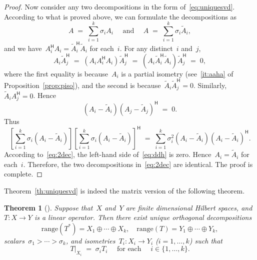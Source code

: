 \documentclass[11pt,a4paper]{article}  %
\numberwithin{equation}{section}
\newtheorem{theorem}{Theorem}%
\theoremstyle{definition}
\newcommand{\hmt}{{\scriptscriptstyle{{\mathsf{H}}}}}
\newcommand{\range}{\mathrm{range}}
\begin{document}
\begin{proof}
  Now consider any two decompositions in the form of~\eqref{eq:uniquesvd}. According to what is
  proved above, we can formulate the decompositions as
  \begin{equation}
    \label{eq:2dec}
    A \;=\; \sum_{i=1}^k \sigma_i A_i \quad \text{ and } \quad
    A\;=\;\sum_{i=1}^k \sigma_i \tilde{A}_i,
  \end{equation}
  and we have~$A_i^\hmt A_i= \tilde{A}_i^\hmt\tilde{A}_i$ for each~$i$.
  For any distinct~$i$ and~$j$,
  \begin{equation*}
    A_i\tilde{A}_j^\hmt \;=\; (A_iA_i^\hmt A_i)\tilde{A}_j^\hmt
    \;=\; (A_i\tilde{A}_i^\hmt \tilde{A}_i)\tilde{A}_j^\hmt \;=\; 0,
  \end{equation*}
  where the first equality is because~$A_i$ is a partial isometry (see~\ref{it:aaha} of
  Proposition~\ref{prop:piso}), and the second is because~$\tilde{A}_i\tilde{A}_j^\hmt = 0$.
  Similarly, $\tilde{A}_iA_j^\hmt = 0$. Hence
  \begin{equation*}
    (A_i-\tilde{A}_i)(A_j-\tilde{A}_j)^\hmt \;=\; 0.
  \end{equation*}
  Thus
  \begin{equation}
    \label{eq:ddh}
    \left[\sum_{i=1}^k \sigma_i(A_i-\tilde{A}_i) \right]
    \left[\sum_{i=1}^k \sigma_i(A_i-\tilde{A}_i) \right]^\hmt
    \;=\; \sum_{i=1}^k \sigma_i^2 (A_i-\tilde{A}_i)(A_i-\tilde{A}_i)^\hmt.
  \end{equation}
  According to~\eqref{eq:2dec}, the left-hand side of~\eqref{eq:ddh} is zero.
  Hence~$A_i=\tilde{A}_i$ for each~$i$. Therefore, the two decompositions in~\eqref{eq:2dec} are
  identical. The proof is complete.
\end{proof}

Theorem~\ref{th:uniquesvd} is indeed the matrix version of the following theorem.

\begin{theorem}[{\cite[Theorem~1]{Koranyi_2001}}]\label{th:orthodec}
  Suppose that~$X$ and~$Y$ are finite dimensional Hilbert spaces, and~$T\mathrel{:}X\to Y$ is a linear
  operator. Then there exist unique orthogonal decompositions
  \begin{equation*}
    \range(T^*) = X_1 \oplus \cdots \oplus X_k, \quad
    \range(T) = Y_1 \oplus \cdots \oplus Y_k,
  \end{equation*}
  scalars~$\sigma_1>\cdots >\sigma_k$, and isometries~$T_i\mathrel{:}X_i\to Y_i$ \textnormal{(}$i=1,
  \dots, k$\textnormal{)}
  such that
  \begin{equation*}
    T|_{X_i} \;=\; \sigma_i T_i
    \quad \text{ for each }\quad i\in\{1,\dots,k\}.
  \end{equation*}
\end{theorem}
\end{document}
